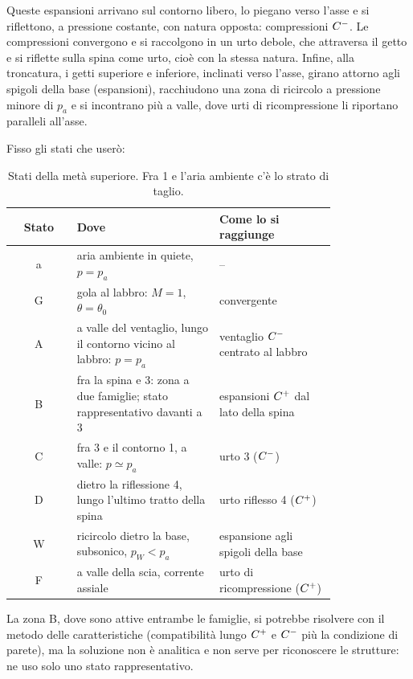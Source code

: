Queste espansioni arrivano sul contorno libero, lo piegano verso l'asse e si riflettono, a pressione costante, con
natura opposta: compressioni $C^{-}$. Le compressioni convergono e si raccolgono in un urto debole, che attraversa il
getto e si riflette sulla spina come urto, cioè con la stessa natura. Infine, alla troncatura, i getti superiore e
inferiore, inclinati verso l'asse, girano attorno agli spigoli della base (espansioni), racchiudono una zona di
ricircolo a pressione minore di $p_a$ e si incontrano più a valle, dove urti di ricompressione li riportano paralleli
all'asse.


Fisso gli stati che userò:
\begin{table}[H]
\centering\small
\begin{tabular}{cp{0.44\linewidth}p{0.36\linewidth}}
\toprule
Stato & Dove & Come lo si raggiunge \\
\midrule
a & aria ambiente in quiete, $p=p_a$ & -- \\
G & gola al labbro: $M=1$, $\theta=\theta_0$ & convergente \\
A & a valle del ventaglio, lungo il contorno vicino al labbro: $p=p_a$ & ventaglio $C^{-}$ centrato al labbro \\
B & fra la spina e 3: zona a due famiglie; stato rappresentativo davanti a 3 & espansioni $C^{+}$ dal lato della spina \\
C & fra 3 e il contorno 1, a valle: $p\simeq p_a$ & urto 3 ($C^{-}$) \\
D & dietro la riflessione 4, lungo l'ultimo tratto della spina & urto riflesso 4 ($C^{+}$) \\
W & ricircolo dietro la base, subsonico, $p_W<p_a$ & espansione agli spigoli della base \\
F & a valle della scia, corrente assiale & urto di ricompressione ($C^{+}$) \\
\bottomrule
\end{tabular}
\caption{Stati della metà superiore. Fra 1 e l'aria ambiente c'è lo strato di taglio.}
\end{table}
La zona B, dove sono attive entrambe le famiglie, si potrebbe risolvere con il metodo delle caratteristiche
(compatibilità lungo $C^{+}$ e $C^{-}$ più la condizione di parete), ma la soluzione non è analitica e non serve per
riconoscere le strutture: ne uso solo uno stato rappresentativo.

